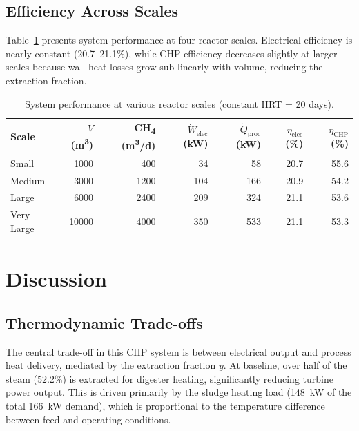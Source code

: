 \documentclass[12pt, letterpaper]{article}
\begin{document}
\subsection{Efficiency Across Scales}

Table~\ref{tab:efficiency} presents system performance at four reactor scales. Electrical efficiency is nearly constant (20.7--21.1\%), while CHP efficiency decreases slightly at larger scales because wall heat losses grow sub-linearly with volume, reducing the extraction fraction.

\begin{table}[H]
  \centering
  \caption{System performance at various reactor scales (constant HRT = 20 days).}
  \label{tab:efficiency}
  \begin{tabular}{@{}lrrrrrr@{}}
    \toprule
    \textbf{Scale} & \textbf{$V$ (m\textsuperscript{3})} & \textbf{CH\textsubscript{4} (m\textsuperscript{3}/d)} & \textbf{$\dot{W}_\text{elec}$ (kW)} & \textbf{$\dot{Q}_\text{proc}$ (kW)} & \textbf{$\eta_\text{elec}$ (\%)} & \textbf{$\eta_\text{CHP}$ (\%)} \\
    \midrule
    Small      & 1000  &  400 &  34 &  58 & 20.7 & 55.6 \\
    Medium     & 3000  & 1200 & 104 & 166 & 20.9 & 54.2 \\
    Large      & 6000  & 2400 & 209 & 324 & 21.1 & 53.6 \\
    Very Large & 10000 & 4000 & 350 & 533 & 21.1 & 53.3 \\
    \bottomrule
  \end{tabular}
\end{table}

\section{Discussion}

\subsection{Thermodynamic Trade-offs}

The central trade-off in this CHP system is between electrical output and process heat delivery, mediated by the extraction fraction $y$. At baseline, over half of the steam (52.2\%) is extracted for digester heating, significantly reducing turbine power output. This is driven primarily by the sludge heating load (\SI{148}{\kilo\watt} of the total \SI{166}{\kilo\watt} demand), which is proportional to the temperature difference between feed and operating conditions.
\end{document}
